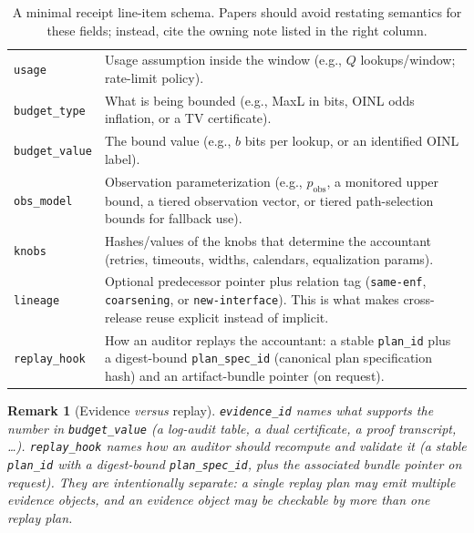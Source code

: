 \documentclass[11pt]{article}
\newtheorem{remark}{Remark}
\begin{document}
\begin{table}[t]
\begin{tabularx}{\linewidth}{@{}lX@{}}
\texttt{usage} & Usage assumption inside the window (e.g., $Q$ lookups/window; rate-limit policy).\cite{series:bossfightB} \\
\texttt{budget\_type} & What is being bounded (e.g., MaxL in bits, OINL odds inflation, or a TV certificate).\cite{series:endpointbridge,series:knapsacktransport} \\
\texttt{budget\_value} & The bound value (e.g., $b$ bits per lookup, or an identified OINL label).\cite{series:oddsinflation,series:abomoinl} \\
\texttt{obs\_model} & Observation parameterization (e.g., $p_{\mathrm{obs}}$, a monitored upper bound, a tiered observation vector, or tiered path-selection bounds for fallback use).\cite{series:obsatten,series:tieredobs,series:fallbacktax} \\
\texttt{knobs} & Hashes/values of the knobs that determine the accountant (retries, timeouts, widths, calendars, equalization params).\cite{series:bossfightB,series:mceq} \\
\texttt{lineage} & Optional predecessor pointer plus relation tag (\texttt{same-enf}, \texttt{coarsening}, or \texttt{new-interface}). This is what makes cross-release reuse explicit instead of implicit.\cite{series:traceifaces,series:recert,series:releaseproperty} \\
\texttt{replay\_hook} & How an auditor replays the accountant: a stable \texttt{plan\_id} plus a digest-bound \texttt{plan\_spec\_id} (canonical plan specification hash) and an artifact-bundle pointer (on request).\cite{series:contractobjects,series:transparencyprimitives} \\
\bottomrule
\end{tabularx}
\caption{A minimal receipt line-item schema. Papers should avoid restating semantics for these fields; instead, cite the owning note listed in the right column.}
\label{tab:minschema}
\end{table}
\begin{remark}[Evidence \emph{versus} replay]
\label{rem:evidence-vs-replay}
\texttt{evidence\_id} names \emph{what} supports the number in \texttt{budget\_value} (a log-audit table, a dual certificate, a proof transcript, \dots).
\texttt{replay\_hook} names \emph{how} an auditor should recompute and validate it (a stable \texttt{plan\_id} with a digest-bound \texttt{plan\_spec\_id}, plus the associated bundle pointer on request).
They are intentionally separate: a single replay plan may emit multiple evidence objects, and an evidence object may be checkable by more than one replay plan.
\end{remark}
\end{document}
